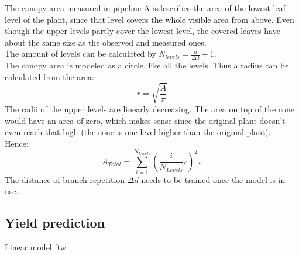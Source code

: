 The canopy area measured in pipeline A isdescribes the area of the lowest leaf level of the plant, since that level covers the whole visible area from above. Even though the upper levels partly cover the lowest level, the covered leaves have about the same size as the observed and measured ones.\\
The amount of levels can be calculated by $N_{levels} = \frac{h}{\Delta d}+1$.\\ 
The canopy area is modeled as a circle, like all the levels. Thus a radius can be calculated from the area:
$$r = \sqrt{\frac{A}{\pi}}$$
The radii of the upper levels are linearly decreasing. The area on top of the cone would have an area of zero, which makes sense since the original plant doesn't even reach that high (the cone is one level higher than the original plant).\\ Hence:
$$A_{Total} = \sum_{i=1}^{N_{Levels}}(\frac{i}{N_{Levels}}r)^2\pi$$
The distance of branch repetition $\Delta d$ needs to be trained once the model is in use.
\subsection{Yield prediction}

\label{section:yieldPrediction}
Linear model ftw.
